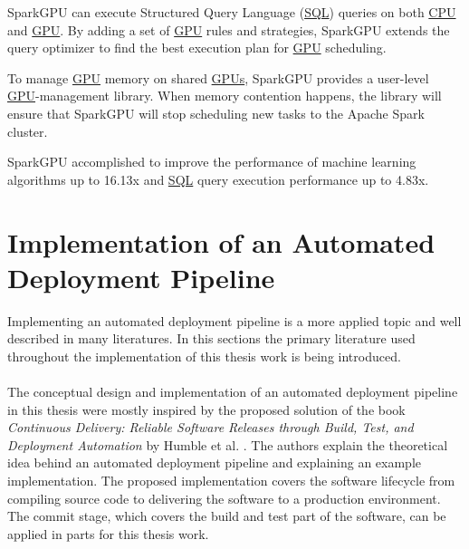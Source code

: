 SparkGPU can execute Structured Query Language (\hyperlink{abbr:sql}{SQL}) queries on both \hyperlink{abbr:cpu}{CPU} and \hyperlink{abbr:gpu}{GPU}.
By adding a set of \hyperlink{abbr:gpu}{GPU} rules and strategies, SparkGPU extends the query optimizer to find the best execution plan for \hyperlink{abbr:gpu}{GPU} scheduling.

To manage \hyperlink{abbr:gpu}{GPU} memory on shared \hyperlink{abbr:gpu}{GPUs}, SparkGPU provides a user-level \hyperlink{abbr:gpu}{GPU}-management library.
When memory contention happens, the library will ensure that SparkGPU will stop scheduling new tasks to the Apache Spark cluster.

SparkGPU accomplished to improve the performance of machine learning algorithms up to 16.13x and \hyperlink{abbr:sql}{SQL} query execution performance up to 4.83x.


\section{Implementation of an Automated Deployment Pipeline}
Implementing an automated deployment pipeline is a more applied topic and well described in many literatures. In this sections the primary literature used throughout the implementation of this thesis work is being introduced.


\paragraph{}The conceptual design and implementation of an automated deployment pipeline in this thesis were mostly inspired by the proposed solution of the book \textit{Continuous Delivery: Reliable Software Releases through Build, Test, and Deployment Automation} by Humble et al. \cite{Farley2010CI}.
The authors explain the theoretical idea behind an automated deployment pipeline and explaining an example implementation.
The proposed implementation covers the software lifecycle from compiling source code to delivering the software to a production environment.
The commit stage, which covers the build and test part of the software, can be applied in parts for this thesis work.
